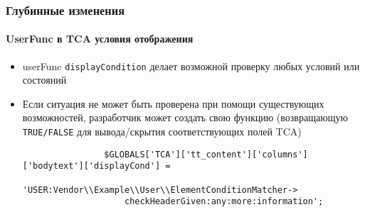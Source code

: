 \begin{frame}[fragile]
	\frametitle{Глубинные изменения}
	\framesubtitle{UserFunc в TCA условия отображения}

	\begin{itemize}
		\item userFunc \texttt{displayCondition} делает возможной проверку любых условий или состояний
		\item Если ситуация не может быть проверена при помощи существующих возможностей, разработчик может создать свою
			функцию\newline
			(возвращающую \texttt{TRUE/FALSE} для вывода/скрытия соответствующих полей TCA)

			\begin{lstlisting}
				$GLOBALS['TCA']['tt_content']['columns']['bodytext']['displayCond'] =
				  'USER:Vendor\\Example\\User\\ElementConditionMatcher->
				    checkHeaderGiven:any:more:information';
			\end{lstlisting}

	\end{itemize}

\end{frame}


